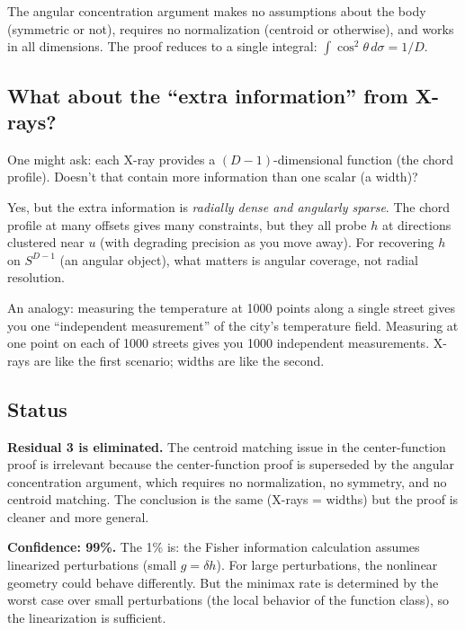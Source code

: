 The angular concentration argument makes no assumptions about the body (symmetric or not), requires no normalization (centroid or otherwise), and works in all dimensions. The proof reduces to a single integral: $\int \cos^2\theta \, d\sigma = 1/D$.

\subsection{What about the ``extra information'' from X-rays?}

One might ask: each X-ray provides a $(D-1)$-dimensional function (the chord profile). Doesn't that contain more information than one scalar (a width)?

Yes, but the extra information is \emph{radially dense and angularly sparse}. The chord profile at many offsets gives many constraints, but they all probe $h$ at directions clustered near $u$ (with degrading precision as you move away). For recovering $h$ on $S^{D-1}$ (an angular object), what matters is angular coverage, not radial resolution.

An analogy: measuring the temperature at 1000 points along a single street gives you one ``independent measurement'' of the city's temperature field. Measuring at one point on each of 1000 streets gives you 1000 independent measurements. X-rays are like the first scenario; widths are like the second.

\subsection{Status}

\textbf{Residual 3 is eliminated.} The centroid matching issue in the center-function proof is irrelevant because the center-function proof is superseded by the angular concentration argument, which requires no normalization, no symmetry, and no centroid matching. The conclusion is the same (X-rays = widths) but the proof is cleaner and more general.

\textbf{Confidence: 99\%.} The 1\% is: the Fisher information calculation assumes linearized perturbations (small $g = \delta h$). For large perturbations, the nonlinear geometry could behave differently. But the minimax rate is determined by the worst case over small perturbations (the local behavior of the function class), so the linearization is sufficient.
